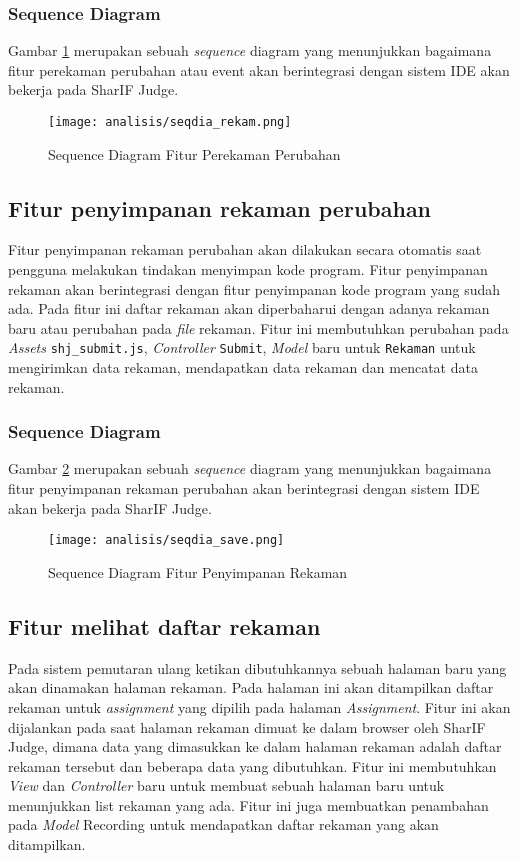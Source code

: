 \subsubsection{Sequence Diagram}
Gambar \ref{fig:3:2:seqdia_rekam} merupakan sebuah \textit{sequence} diagram yang menunjukkan bagaimana fitur perekaman perubahan atau event akan berintegrasi dengan sistem IDE akan bekerja pada SharIF Judge.
\begin{figure}[H]
	\centering
	\texttt{[image: analisis/seqdia\_rekam.png]}
	\caption{Sequence Diagram Fitur Perekaman Perubahan}
	\label{fig:3:2:seqdia_rekam}
\end{figure}

\subsection{Fitur penyimpanan rekaman perubahan}
\label{sub:3:2:save}
Fitur penyimpanan rekaman perubahan akan dilakukan secara otomatis saat pengguna melakukan tindakan menyimpan kode program. Fitur penyimpanan rekaman akan berintegrasi dengan fitur penyimpanan kode program yang sudah ada. Pada fitur ini daftar rekaman akan diperbaharui dengan adanya rekaman baru atau perubahan pada \textit{file} rekaman. Fitur ini membutuhkan perubahan pada \textit{Assets} \verb|shj_submit.js|, \textit{Controller} \verb|Submit|, \textit{Model} baru untuk \verb|Rekaman| untuk mengirimkan data rekaman, mendapatkan data rekaman dan mencatat data rekaman.

\subsubsection{Sequence Diagram}
Gambar \ref{fig:3:2:seqdia_save} merupakan sebuah \textit{sequence} diagram yang menunjukkan bagaimana fitur penyimpanan rekaman perubahan akan berintegrasi dengan sistem IDE akan bekerja pada SharIF Judge.
\begin{figure}
	\centering
	\texttt{[image: analisis/seqdia\_save.png]}
	\caption{Sequence Diagram Fitur Penyimpanan Rekaman}
	\label{fig:3:2:seqdia_save}
\end{figure}

\subsection{Fitur melihat daftar rekaman}
\label{sub:3:2:lookup}
Pada sistem pemutaran ulang ketikan dibutuhkannya sebuah halaman baru yang akan dinamakan halaman rekaman. Pada halaman ini akan ditampilkan daftar rekaman untuk \textit{assignment} yang dipilih pada halaman \textit{Assignment}. Fitur ini akan dijalankan pada saat halaman rekaman dimuat ke dalam browser oleh SharIF Judge, dimana data yang dimasukkan ke dalam halaman rekaman adalah daftar rekaman tersebut dan beberapa data yang dibutuhkan. Fitur ini membutuhkan \textit{View} dan \textit{Controller} baru untuk membuat sebuah halaman baru untuk menunjukkan list rekaman yang ada. Fitur ini juga membuatkan penambahan pada \textit{Model} Recording untuk mendapatkan daftar rekaman yang akan ditampilkan.

